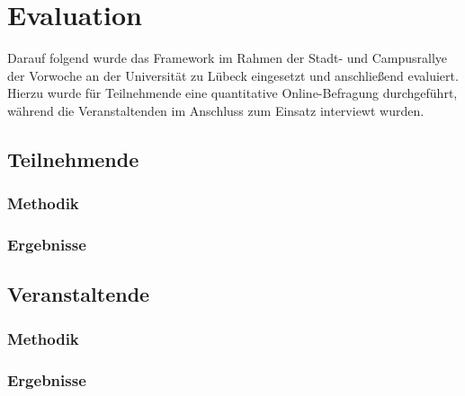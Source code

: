 \chapter{Evaluation} \label{chapter:evaluation}

Darauf folgend wurde das Framework im Rahmen der Stadt- und Campusrallye der
Vorwoche an der Universität zu Lübeck eingesetzt und anschließend evaluiert.
Hierzu wurde für Teilnehmende eine quantitative Online-Befragung durchgeführt,
während die Veranstaltenden im Anschluss zum Einsatz interviewt wurden.

\section{Teilnehmende}

\subsection{Methodik}


\subsection{Ergebnisse}

\section{Veranstaltende}

\subsection{Methodik}

\subsection{Ergebnisse}